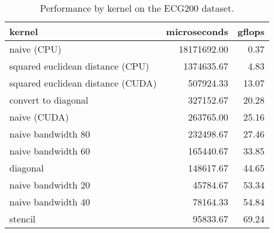 \begin{table}
\centering
\caption{Performance by kernel on the ECG200 dataset.}
\label{ecg_table}
\begin{tabular}{lrr}
\toprule
                           kernel &  microseconds &  gflops \\
\midrule
                      naive (CPU) &   18171692.00 &    0.37 \\
 squared euclidean distance (CPU) &    1374635.67 &    4.83 \\
squared euclidean distance (CUDA) &     507924.33 &   13.07 \\
              convert to diagonal &     327152.67 &   20.28 \\
                     naive (CUDA) &     263765.00 &   25.16 \\
               naive bandwidth 80 &     232498.67 &   27.46 \\
               naive bandwidth 60 &     165440.67 &   33.85 \\
                         diagonal &     148617.67 &   44.65 \\
               naive bandwidth 20 &      45784.67 &   53.34 \\
               naive bandwidth 40 &      78164.33 &   54.84 \\
                          stencil &      95833.67 &   69.24 \\
\bottomrule
\end{tabular}
\end{table}
